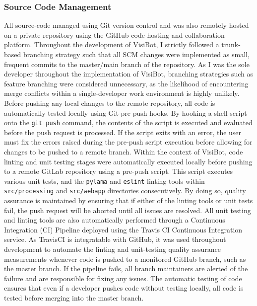 \subsubsection{Source Code Management}

All source-code managed using Git \citep{Git} version control and was also remotely hosted on a private repository using the GitHub \citep{GitHub} code-hosting and collaboration platform. Throughout the development of VisiBot, I strictly followed a trunk-based branching strategy such that all SCM changes were implemented as small, frequent commits to the master/main branch of the repository. As I was the sole developer throughout the implementation of VisiBot, branching strategies such as feature branching were considered unnecessary, as the likelihood of encountering merge conflicts within a single-developer work environment is highly unlikely. Before pushing any local changes to the remote repository, all code is automatically tested locally using Git pre-push hooks. \citep{PrePushHooks} By hooking a shell script onto the \texttt{git push} command, the contents of the script is executed and evaluated before the push request is processed. If the script exits with an error, the user must fix the errors raised during the pre-push script execution before allowing for changes to be pushed to a remote branch. Within the context of VisiBot, code linting and unit testing stages were automatically executed locally before pushing to a remote GitLab repository using a pre-push script. This script executes various unit tests, and the \texttt{pylama} and \texttt{eslint} linting tools within \texttt{src/processing} and \texttt{src/webapp} directories consecutively. By doing so, quality assurance is maintained by ensuring that if either of the linting tools or unit tests fail, the push request will be aborted until all issues are resolved. All unit testing and linting tools are also automatically performed through a Continuous Integration (CI) Pipeline deployed using the Travis CI \citep{TravisCI} Continuous Integration service. As TravisCI is integratable with GitHub, it was used throughout development to automate the linting and unit-testing quality assurance measurements whenever code is pushed to a monitored GitHub branch, such as the master branch. If the pipeline fails, all branch maintainers are alerted of the failure and are responsible for fixing any issues. The automatic testing of code ensures that even if a developer pushes code without testing locally, all code is tested before merging into the master branch.
